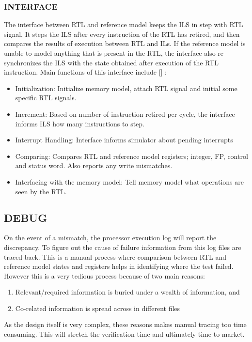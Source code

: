 \subsubsection {INTERFACE}
The interface between RTL and reference model keeps the ILS in step with RTL signal. It steps the ILS after every instruction of the RTL has retired, and then compares the results of execution between RTL and ILs. If the reference model is unable to model anything that is present in the RTL, the interface also re-synchronizes the ILS with the state obtained after execution of the RTL instruction.
Main functions of this interface include [] :
\begin{itemize}
	\item Initialization: Initialize memory model, attach RTL signal and initial some specific RTL signals.
	\item Increment: Based on number of instruction retired per cycle, the interface informs ILS how many instructions to step.
	\item Interrupt Handling: Interface informs simulator about pending interrupts
	\item Comparing: Compares RTL and reference model registers; integer, FP, control and status word. Also reports any write mismatches. 
	\item Interfacing with the memory model: Tell memory model what operations are seen by the RTL. 
\end{itemize}


\subsection {DEBUG}

On the event of a mismatch, the processor execution log will report the discrepancy. To figure out the cause of failure information from this log files are traced back. This is a manual process where comparison between RTL and reference model states and registers helps in identifying where the test failed. However this is a very tedious process because of two main reasons:
\begin{enumerate}
	\item Relevant/required information is buried under a wealth of information, and
	\item Co-related information is spread across in different files
\end{enumerate}

As the design itself is very complex, these reasons makes manual tracing too time consuming. This will stretch the verification time and ultimately time-to-market.   


